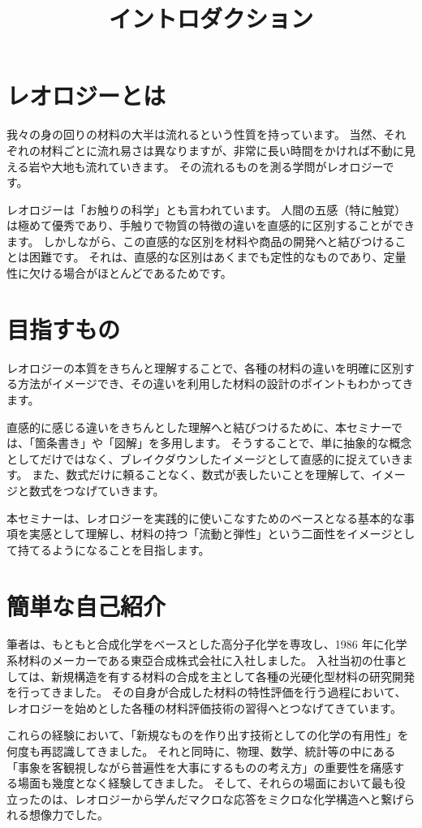 \documentclass[uplatex,dvipdfmx,a4paper,11pt]{jsreport}
\title{イントロダクション}
\author{}
\date{}
\begin{document}
\maketitle

\section*{レオロジーとは}
我々の身の回りの材料の大半は流れるという性質を持っています。
当然、それぞれの材料ごとに流れ易さは異なりますが、非常に長い時間をかければ不動に見える岩や大地も流れていきます。
その流れるものを測る学問がレオロジーです。

レオロジーは「お触りの科学」とも言われています。
人間の五感（特に触覚）は極めて優秀であり、手触りで物質の特徴の違いを直感的に区別することができます。
しかしながら、この直感的な区別を材料や商品の開発へと結びつけることは困難です。
それは、直感的な区別はあくまでも定性的なものであり、定量性に欠ける場合がほとんどであるためです。

\section*{目指すもの}
レオロジーの本質をきちんと理解することで、各種の材料の違いを明確に区別する方法がイメージでき、その違いを利用した材料の設計のポイントもわかってきます。

直感的に感じる違いをきちんとした理解へと結びつけるために、本セミナーでは、「箇条書き」や「図解」を多用します。
そうすることで、単に抽象的な概念としてだけではなく、ブレイクダウンしたイメージとして直感的に捉えていきます。
また、数式だけに頼ることなく、数式が表したいことを理解して、イメージと数式をつなげていきます。

本セミナーは、レオロジーを実践的に使いこなすためのベースとなる基本的な事項を実感として理解し、材料の持つ「流動と弾性」という二面性をイメージとして持てるようになることを目指します。

\section*{簡単な自己紹介}

筆者は、もともと合成化学をベースとした高分子化学を専攻し、1986 年に化学系材料のメーカーである東亞合成株式会社に入社しました。
入社当初の仕事としては、新規構造を有する材料の合成を主として各種の光硬化型材料の研究開発を行ってきました。
その自身が合成した材料の特性評価を行う過程において、レオロジーを始めとした各種の材料評価技術の習得へとつなげてきています。

これらの経験において、「新規なものを作り出す技術としての化学の有用性」を何度も再認識してきました。
それと同時に、物理、数学、統計等の中にある「事象を客観視しながら普遍性を大事にするものの考え方」の重要性を痛感する場面も幾度となく経験してきました。
そして、それらの場面において最も役立ったのは、レオロジーから学んだマクロな応答をミクロな化学構造へと繋げられる想像力でした。
\end{document}
